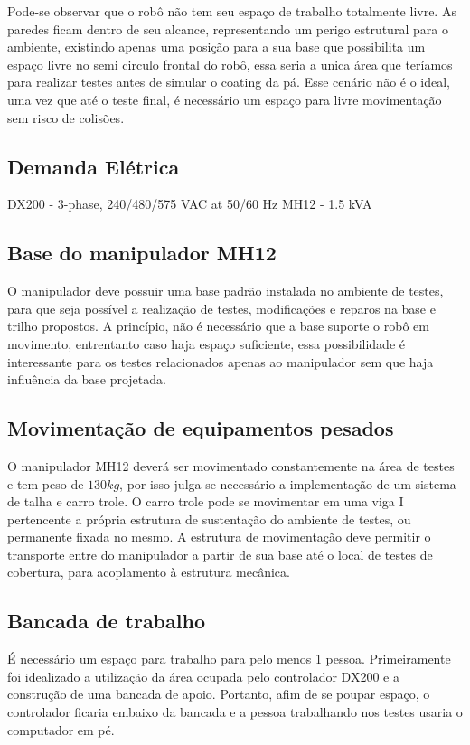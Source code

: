 Pode-se observar que o robô não tem seu espaço de trabalho totalmente livre. As
paredes ficam dentro de seu alcance, representando um perigo estrutural
para o ambiente,  existindo apenas uma posição para a sua base que possibilita
um espaço livre no semi circulo frontal do robô, essa seria a unica área que teríamos para realizar testes 
antes de simular o coating da pá. Esse cenário não é o ideal, uma vez que até o teste final, 
é necessário um espaço para livre movimentação sem risco de colisões. 

\subsection{Demanda Elétrica}

DX200 - 3-phase, 240/480/575 VAC at 50/60 Hz
MH12 -	1.5 kVA

\subsection{Base do manipulador MH12}
O manipulador deve possuir uma base padrão instalada no ambiente de testes, para
que seja possível a realização de testes, modificações e reparos na base e
trilho propostos. 
A princípio, não é necessário que a base suporte o robô em
movimento, entrentanto caso haja espaço suficiente, essa possibilidade é
interessante para os testes relacionados apenas ao manipulador sem que haja
influência da base projetada.


\subsection{Movimentação de equipamentos pesados}
O manipulador MH12 deverá ser movimentado constantemente na área de testes e tem
peso de $130kg$, por isso julga-se necessário a implementação de um sistema de
talha e carro trole. O carro trole pode se movimentar em uma viga I pertencente
a própria estrutura de sustentação do ambiente de testes, ou permanente fixada
no mesmo. A estrutura de movimentação deve permitir o transporte entre do
manipulador a partir de sua base até o local de testes de cobertura, para
acoplamento à estrutura mecânica.


\subsection{Bancada de trabalho}
É necessário um espaço para trabalho para pelo menos 1 pessoa.
Primeiramente foi idealizado a utilização da área ocupada pelo controlador DX200
e a construção de uma bancada de apoio. 
Portanto, afim de se poupar espaço, o
controlador ficaria embaixo da bancada e a pessoa trabalhando nos testes usaria
o computador em pé.

